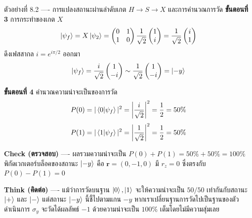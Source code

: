 \begin{psctbox}{ตัวอย่างที่ 8.2 ---- การแปลงสถานะผ่านลำดับเกต $H \to S \to X$ และการคำนวณการวัด}
\textbf{ขั้นตอนที่ 3} การกระทำของเกต $X$
\begin{equation*}
\ket{\psi_f} = X \ket{\psi_2} = \begin{pmatrix} 0 & 1 \\ 1 & 0 \end{pmatrix} \frac{1}{\sqrt{2}}\begin{pmatrix} 1 \\ i \end{pmatrix} = \frac{1}{\sqrt{2}}\begin{pmatrix} i \\ 1 \end{pmatrix}
\end{equation*}
ดึงเฟสสากล $i = e^{i\pi/2}$ ออกมา
\begin{equation*}
\ket{\psi_f} = \frac{i}{\sqrt{2}}\begin{pmatrix} 1 \\ -i \end{pmatrix} \sim \frac{1}{\sqrt{2}}\begin{pmatrix} 1 \\ -i \end{pmatrix} = \ket{-y}
\end{equation*}

\textbf{ขั้นตอนที่ 4} คำนวณความน่าจะเป็นของการวัด
\begin{equation*}
P(0) = |\braket{0}{\psi_f}|^2 = \left| \frac{i}{\sqrt{2}} \right|^2 = \frac{1}{2} = 50\%
\end{equation*}
\begin{equation*}
P(1) = |\braket{1}{\psi_f}|^2 = \left| \frac{1}{\sqrt{2}} \right|^2 = \frac{1}{2} = 50\%
\end{equation*}

\textbf{Check (ตรวจสอบ)} ---- ผลรวมความน่าจะเป็น $P(0) + P(1) = 50\% + 50\% = 100\%$ พิกัดเวกเตอร์บล็อคของสถานะ $\ket{-y}$ คือ $\mathbf{r} = (0, -1, 0)$ มี $r_z = 0$ ซึ่งตรงกับ $P(0) - P(1) = 0$

\textbf{Think (คิดต่อ)} ---- แม้ว่าการวัดบนฐาน $\ket{0}, \ket{1}$ จะให้ความน่าจะเป็น $50/50$ เท่ากันกับสถานะ $\ket{+}$ และ $\ket{-}$ แต่สถานะ $\ket{-y}$ นี้ชี้ไปตามแกน $-y$ หากเราเปลี่ยนฐานการวัดไปเป็นฐานของตัวดำเนินการ $\sigma_y$ จะวัดได้ผลลัพธ์ $-1$ ด้วยความน่าจะเป็น $100\%$ เต็มโดยไม่มีความสุ่มเลย
\end{psctbox}

